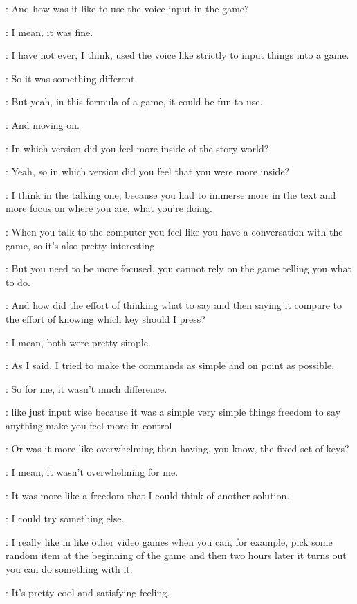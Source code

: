\Gabriel: And how was it like to use the voice input in the game?

\Kacper: I mean, it was fine.

\Kacper: I have not ever, I think, used the voice like strictly to input things into a game.

\Kacper: So it was something different.

\Kacper: But yeah, in this formula of a game, it could be fun to use.

\Gabriel: And moving on.

\Gabriel: In which version did you feel more inside of the story world?

\Gabriel: Yeah, so in which version did you feel that you were more inside?

\Kacper: I think in the talking one, because you had to immerse more in the text and more focus on where you are, what you're doing.

\Kacper: When you talk to the computer you feel like you have a conversation with the game, so it's also pretty interesting.

\Kacper: But you need to be more focused, you cannot rely on the game telling you what to do.

\Gabriel: And how did the effort of thinking what to say and then saying it compare to the effort of knowing which key should I press?

\Kacper: I mean, both were pretty simple.

\Kacper: As I said, I tried to make the commands as simple and on point as possible.

\Kacper: So for me, it wasn't much difference.

\Kacper: like just input wise because it was a simple very simple things freedom to say anything make you feel more in control

\Gabriel: Or was it more like overwhelming than having, you know, the fixed set of keys?

\Kacper: I mean, it wasn't overwhelming for me.

\Kacper: It was more like a freedom that I could think of another solution.

\Kacper: I could try something else.

\Kacper: I really like in like other video games when you can, for example, pick some random item at the beginning of the game and then two hours later it turns out you can do something with it.

\Kacper: It's pretty cool and satisfying feeling.

